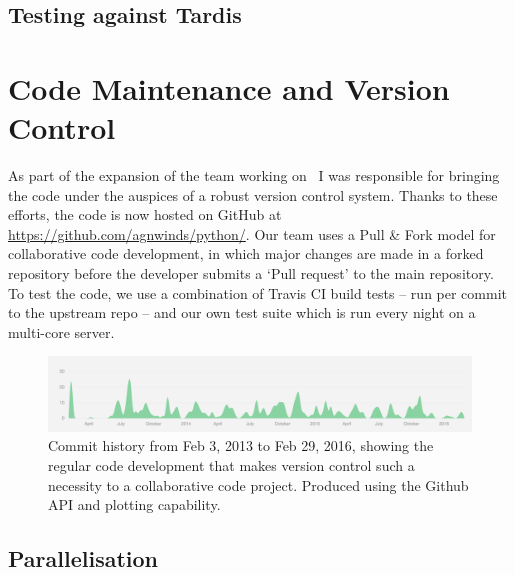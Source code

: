 \subsection{Testing against Tardis}


\section{Code Maintenance and Version Control}
\label{sec:code_maintenance}

As part of the expansion of the team working on \py\, I was responsible
for bringing the code under the auspices of a robust version control system.
Thanks to these efforts, the code is now hosted on GitHub at 
\url{https://github.com/agnwinds/python/}. Our team uses a Pull \& Fork model
for collaborative code development, in which major changes are made in a 
forked repository before the developer submits a `Pull request' to the main 
repository. To test the code, we use a combination of Travis CI build tests 
-- run per commit to the upstream repo -- and our own test suite which is 
run every night on a multi-core server. 

\begin{figure}
\centering
\includegraphics[width=1.0\textwidth]{figures/03-radtrans/github1.png}
\caption
{
Commit history from Feb 3, 2013 to Feb 29, 2016, showing the regular code development
that makes version control such a necessity to a collaborative code project. Produced
using the Github API and plotting capability.
} 
\label{fig:github}
\end{figure}

\subsection{Parallelisation} 










